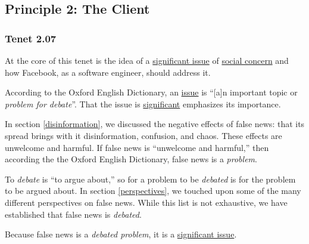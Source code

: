 
\subsection{Principle 2: The Client}

\subsubsection{Tenet 2.07}


\par At the core of this tenet is the idea of a \ul{significant issue} of \ul{social concern} and how Facebook, as a software engineer, should address it.


\par According to the Oxford English Dictionary, an \ul{issue} is ``[a]n important topic or \emph{problem for debate}''. \cite{oxford} That the issue is \ul{significant} emphasizes its importance.

\par In section \ref{disinformation}, we discussed the negative effects of false news: that its spread brings with it disinformation, confusion, and chaos. These effects are unwelcome and harmful. If false news is ``unwelcome and harmful,'' then according the the Oxford English Dictionary, false news is a \emph{problem}. \cite{oxford}

\par To \emph{debate} is ``to argue about,'' \cite{oxford} so for a problem to be \emph{debated} is for the problem to be argued about. In section \ref{perspectives}, we touched upon some of the many different perspectives on false news. While this list is not exhaustive, we have established that false news is \emph{debated}.

\par Because false news is a \emph{debated problem}, it is a \ul{significant issue}.


